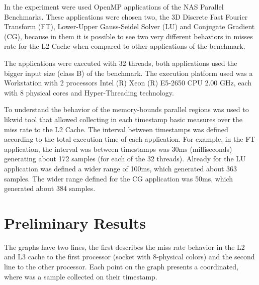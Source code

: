 \documentclass[conference,letter,10pt,final]{IEEEtran}
\begin{document}
In the experiment were used OpenMP applications of the NAS Parallel
Benchmarks. These applications were chosen two, the 3D Discrete Fast
Fourier Transform (FT), Lower-Upper Gauss-Seidel Solver (LU) and
Conjugate Gradient (CG), because in them it is possible to see two
very different behaviors in misses rate for the L2 Cache when compared
to other applications of the benchmark. 

The applications were executed with 32 threads, both applications used
the bigger input size (class B) of the benchmark. The execution
platform used was a Workstation with 2 processors Intel (R) Xeon (R)
E5-2650 CPU 2.00 GHz, each with 8 physical cores and Hyper-Threading
technology. 

To understand the behavior of the memory-bounds parallel regions was
used to likwid tool that allowed collecting in each timestamp basic
measures over the miss rate to the L2 Cache. The interval between
timestamps was defined according to the total execution time of each
application. For example, in the FT application, the interval was
between timestamps was 30ms (milliseconds) generating about 172
samples (for each of the 32 threads). Already for the LU application
was defined a wider range of 100ms, which generated about 363
samples. The wider range defined for the CG application was 50ms,
which generated about 384 samples. 

\section{Preliminary Results}
\label{sec:orgheadline4}
\label{sec:results}

The graphs have two lines, the first describes the miss
rate behavior in the L2 and L3 cache to the first processor (socket with
8-physical colors) and the second line to the other processor. Each
point on the graph presents a coordinated, where was a sample
collected on their timestamp. 
\end{document}
